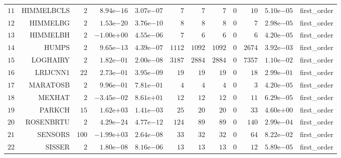 \begin{longtable}{rrrrrrrrrrrr}
  \(    11\) & HIMMELBCLS & \(     2\) & \( 8.94\)e\(-16\) & \( 3.07\)e\(-07\) & \(     7\) & \(     7\) & \(     7\) & \(     0\) & \(    10\) & \( 5.10\)e\(-05\) & first\_order \\
  \(    12\) & HIMMELBG & \(     2\) & \( 1.53\)e\(-20\) & \( 3.76\)e\(-10\) & \(     8\) & \(     8\) & \(     8\) & \(     0\) & \(     7\) & \( 2.98\)e\(-05\) & first\_order \\
  \(    13\) & HIMMELBH & \(     2\) & \(-1.00\)e\(+00\) & \( 4.55\)e\(-06\) & \(     7\) & \(     6\) & \(     6\) & \(     0\) & \(     6\) & \( 4.20\)e\(-05\) & first\_order \\
  \(    14\) & HUMPS & \(     2\) & \( 9.65\)e\(-13\) & \( 4.39\)e\(-07\) & \(  1112\) & \(  1092\) & \(  1092\) & \(     0\) & \(  2674\) & \( 3.92\)e\(-03\) & first\_order \\
  \(    15\) & LOGHAIRY & \(     2\) & \( 1.82\)e\(-01\) & \( 2.00\)e\(-08\) & \(  3187\) & \(  2884\) & \(  2884\) & \(     0\) & \(  7357\) & \( 1.10\)e\(-02\) & first\_order \\
  \(    16\) & LRIJCNN1 & \(    22\) & \( 2.73\)e\(-01\) & \( 3.95\)e\(-09\) & \(    19\) & \(    19\) & \(    19\) & \(     0\) & \(    18\) & \( 2.99\)e\(-01\) & first\_order \\
  \(    17\) & MARATOSB & \(     2\) & \( 9.96\)e\(-01\) & \( 7.81\)e\(-01\) & \(     4\) & \(     4\) & \(     4\) & \(     0\) & \(     3\) & \( 4.20\)e\(-05\) & first\_order \\
  \(    18\) & MEXHAT & \(     2\) & \(-3.45\)e\(-02\) & \( 8.61\)e\(+01\) & \(    12\) & \(    12\) & \(    12\) & \(     0\) & \(    11\) & \( 6.29\)e\(-05\) & first\_order \\
  \(    19\) & PARKCH & \(    15\) & \( 1.62\)e\(+03\) & \( 1.41\)e\(-03\) & \(    25\) & \(    20\) & \(    20\) & \(     0\) & \(    33\) & \( 4.60\)e\(+00\) & first\_order \\
  \(    20\) & ROSENBRTU & \(     2\) & \( 4.29\)e\(-24\) & \( 4.77\)e\(-12\) & \(   124\) & \(    89\) & \(    89\) & \(     0\) & \(   140\) & \( 2.99\)e\(-04\) & first\_order \\
  \(    21\) & SENSORS & \(   100\) & \(-1.99\)e\(+03\) & \( 2.64\)e\(-08\) & \(    33\) & \(    32\) & \(    32\) & \(     0\) & \(    64\) & \( 8.22\)e\(-02\) & first\_order \\
  \(    22\) & SISSER & \(     2\) & \( 1.80\)e\(-08\) & \( 8.16\)e\(-06\) & \(    13\) & \(    13\) & \(    13\) & \(     0\) & \(    12\) & \( 5.89\)e\(-05\) & first\_order \\

\end{longtable}
